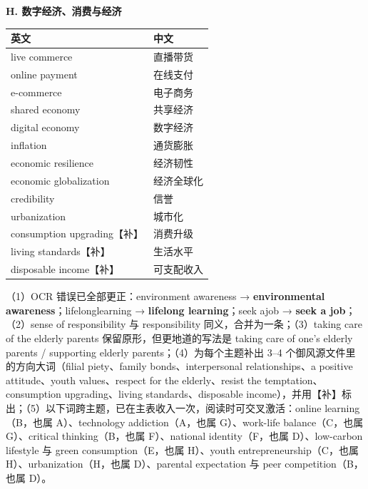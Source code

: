 \documentclass[11pt,a4paper]{ctexart}
\newcommand{\kw}[1]{{\bfseries\color{accent}#1}}
\newcommand{\impr}[1]{\par\addvspace{3pt}\noindent{\bfseries【本次改进】}#1\par\addvspace{3pt}}
\begin{document}
\par\addvspace{5pt}\noindent\textbf{H. 数字经济、消费与经济}\par\addvspace{2pt}
\begin{longtable}{L{5.8cm}L{10.2cm}}
\toprule
\textbf{英文} & \textbf{中文} \\
\midrule
\endhead
live commerce & 直播带货 \\
online payment & 在线支付 \\
e-commerce & 电子商务 \\
shared economy & 共享经济 \\
digital economy & 数字经济 \\
inflation & 通货膨胀 \\
economic resilience & 经济韧性 \\
economic globalization & 经济全球化 \\
credibility & 信誉 \\
urbanization & 城市化 \\
consumption upgrading【补】 & 消费升级 \\
living standards【补】 & 生活水平 \\
disposable income【补】 & 可支配收入 \\
\bottomrule
\end{longtable}

\impr{（1）OCR 错误已全部更正：environment awareness → \kw{environmental awareness}；lifelonglearning → \kw{lifelong learning}；seek ajob → \kw{seek a job}；（2）sense of responsibility 与 responsibility 同义，合并为一条；（3）taking care of the elderly parents 保留原形，但更地道的写法是 taking care of one's elderly parents / supporting elderly parents；（4）为每个主题补出 3--4 个御风源文件里的方向大词（filial piety、family bonds、interpersonal relationships、a positive attitude、youth values、respect for the elderly、resist the temptation、consumption upgrading、living standards、disposable income），并用【补】标出；（5）以下词跨主题，已在主表收入一次，阅读时可交叉激活：online learning（B，也属 A）、technology addiction（A，也属 G）、work-life balance（C，也属 G）、critical thinking（B，也属 F）、national identity（F，也属 D）、low-carbon lifestyle 与 green consumption（E，也属 H）、youth entrepreneurship（C，也属 H）、urbanization（H，也属 D）、parental expectation 与 peer competition（B，也属 D）。}
\end{document}
